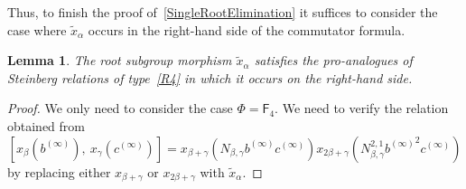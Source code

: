 \documentclass[oneside, 11pt]{amsart}
\numberwithin{equation}{section}
\newtheorem{lemma}{Lemma} \numberwithin{lemma}{section}
\theoremstyle{definition}
\theoremstyle{remark}
\newcommand{\rF}{\mathsf{F}}
\begin{document}
Thus, to finish the proof of~\cref{SingleRootElimination} it suffices to consider the case where $\widetilde{x}_\alpha$ occurs in the right-hand side of the commutator formula.
\begin{lemma} \label{lem:elim-rhs-r4}
 The root subgroup morphism $\widetilde{x}_\alpha$ satisfies the pro-analogues of Steinberg relations of type~\eqref{R4} in which it occurs on the right-hand side.
\end{lemma}
\begin{proof}
We only need to consider the case $\Phi = \rF_4$.
We need to verify the relation obtained from \begin{equation}\label{eq:elim-rhs-r4-1} [x_{\beta}(b^{(\infty)}),\ x_{\gamma}(c^{(\infty)})] = x_{\beta+\gamma}(N_{\beta,\gamma}b^{(\infty)} c^{(\infty)}) x_{2\beta+\gamma}(N_{\beta,\gamma}^{2,1}{b^{(\infty)}}^2c^{(\infty)})\end{equation} by replacing either $x_{\beta+\gamma}$ or $x_{2\beta+\gamma}$ with $\widetilde{x}_{\alpha}$.


\end{proof}
\end{document}
